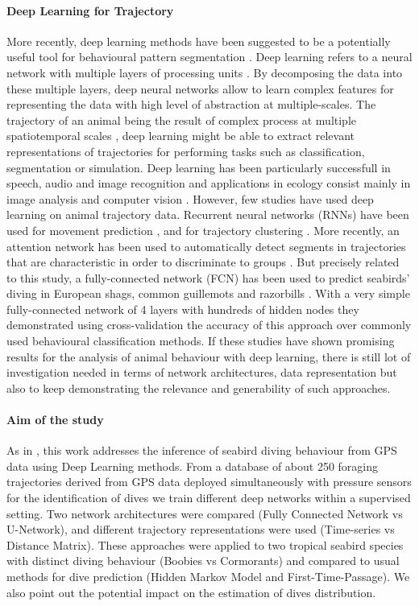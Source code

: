 \documentclass{article}
\begin{document}
\paragraph{Deep Learning for Trajectory}
More recently, deep learning methods have been suggested to be a potentially useful tool for behavioural pattern segmentation \cite{valletta_applications_2017}.
Deep learning refers to a neural network with multiple layers of processing units \cite{lecun_deep_2015}.
By decomposing the data into these multiple layers, deep neural networks allow to learn complex features for representing the data with high level of abstraction at multiple-scales.
The trajectory of an animal being the result of complex process at multiple spatiotemporal scales \cite{nathan_movement_2008}, deep learning might be able to extract relevant representations of trajectories for performing tasks such as classification, segmentation or simulation.
Deep learning has been particularly successfull in speech, audio and image recognition and applications in ecology consist mainly in image analysis and computer vision \cite{weinstein_computer_2018, christin_applications_2019}. However, few studies have used deep learning on animal trajectory data.
Recurrent neural networks (RNNs) have been used for movement prediction \cite{ardakani_encoding_2017,rew_animal_2019}, and for trajectory clustering \cite{peng_deep_2019}. More recently, an attention network has been used to automatically detect segments in trajectories that are characteristic in order to discriminate to groups \cite{maekawa_deep_2020}. But precisely related to this study, a fully-connected network (FCN) has been used to predict seabirds' diving in European shags, common guillemots and razorbills  \cite{browning_predicting_2018}. With a very simple fully-connected network of 4 layers with hundreds of hidden nodes they demonstrated using cross-validation the accuracy of this approach over commonly used behavioural classification methods. If these studies have shown promising results for the analysis of animal behaviour with deep learning, there is still lot of investigation needed in terms of network architectures, data representation but also to keep demonstrating the relevance and generability of such approaches.

\paragraph{Aim of the study}
 As in \cite{browning_predicting_2018}, this work addresses the inference of seabird diving behaviour from GPS data using Deep Learning methods. From a database of about 250 foraging trajectories derived from GPS data deployed simultaneously with pressure sensors for the identification of dives we train different deep networks within a supervised setting. Two network architectures were compared (Fully Connected Network vs U-Network), and different trajectory representations were used (Time-series vs Distance Matrix). These approaches were applied to two tropical seabird species with distinct diving behaviour (Boobies vs Cormorants) and compared to usual methods for dive prediction (Hidden Markov Model and First-Time-Passage). We also point out the potential impact on the estimation of dives distribution.
\end{document}
